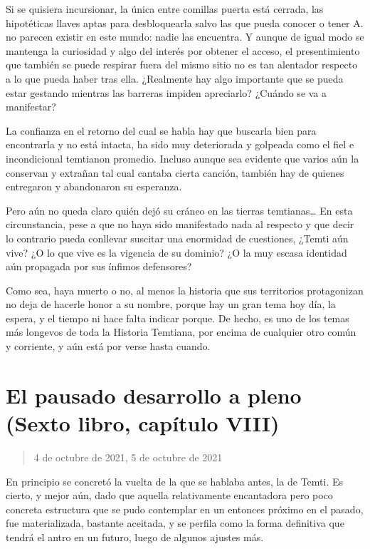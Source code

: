\documentclass[
]{book}
\begin{document}
Si se quisiera incursionar, la única entre comillas puerta está cerrada, las hipotéticas llaves aptas para desbloquearla salvo las que pueda conocer o tener A. no parecen existir en este mundo: nadie las encuentra. Y aunque de igual modo se mantenga la curiosidad y algo del interés por obtener el acceso, el presentimiento que también se puede respirar fuera del mismo sitio no es tan alentador respecto a lo que pueda haber tras ella. ¿Realmente hay algo importante que se pueda estar gestando mientras las barreras impiden apreciarlo? ¿Cuándo se va a manifestar?

La confianza en el retorno del cual se habla hay que buscarla bien para encontrarla y no está intacta, ha sido muy deteriorada y golpeada como el fiel e incondicional temtianon promedio. Incluso aunque sea evidente que varios aún la conservan y extrañan tal cual cantaba cierta canción, también hay de quienes entregaron y abandonaron su esperanza.

Pero aún no queda claro quién dejó su cráneo en las tierras temtianas\ldots{} En esta circunstancia, pese a que no haya sido manifestado nada al respecto y que decir lo contrario pueda conllevar suscitar una enormidad de cuestiones, ¿Temti aún vive? ¿O lo que vive es la vigencia de su dominio? ¿O la muy escasa identidad aún propagada por sus ínfimos defensores?

Como sea, haya muerto o no, al menos la historia que sus territorios protagonizan no deja de hacerle honor a su nombre, porque hay un gran tema hoy día, la espera, y el tiempo ni hace falta indicar porque. De hecho, es uno de los temas más longevos de toda la Historia Temtiana, por encima de cualquier otro común y corriente, y aún está por verse hasta cuando.

\hypertarget{el-pausado-desarrollo-a-pleno-sexto-libro-capuxedtulo-viii}{%
\section{El pausado desarrollo a pleno (Sexto libro, capítulo VIII)}\label{el-pausado-desarrollo-a-pleno-sexto-libro-capuxedtulo-viii}}

\begin{quote}
4 de octubre de 2021, 5 de octubre de 2021
\end{quote}

En principio se concretó la vuelta de la que se hablaba antes, la de Temti. Es cierto, y mejor aún, dado que aquella relativamente encantadora pero poco concreta estructura que se pudo contemplar en un entonces próximo en el pasado, fue materializada, bastante aceitada, y se perfila como la forma definitiva que tendrá el antro en un futuro, luego de algunos ajustes más.
\end{document}
